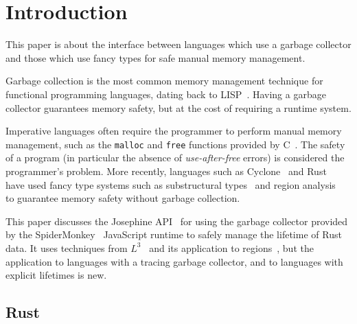 \section{Introduction}

This paper is about the interface between languages
which use a garbage collector and those which use fancy
types for safe manual memory management.

Garbage collection is the most common memory management technique for
functional programming languages, dating back to LISP~\cite{LISP}.
Having a garbage collector guarantees memory safety, but at the
cost of requiring a runtime system.

Imperative languages often require the programmer to perform
manual memory management, such as the \verb|malloc| and \verb|free|
functions provided by C~\cite{K+R}. The safety of a program
(in particular the absence of \emph{use-after-free} errors)
is considered the programmer's problem.
More recently, languages such as Cyclone~\cite{cyclone}
and Rust~\cite{rust} have used fancy type systems
such as substructural types~\cite{girard,Go4,walker}
and region analysis~\cite{regions} to guarantee memory
safety without garbage collection.

This paper discusses the Josephine API~\cite{josephine} for using the
garbage collector provided by the SpiderMonkey~\cite{spidermonkey}
JavaScript runtime to safely manage the lifetime of Rust~\cite{rust}
data. It uses techniques from $L^3$~\cite{l3} and its application
to regions~\cite{l3-with-regions}, but the application to languages
with a tracing garbage collector, and to languages with explicit
lifetimes is new.

\subsection{Rust}

